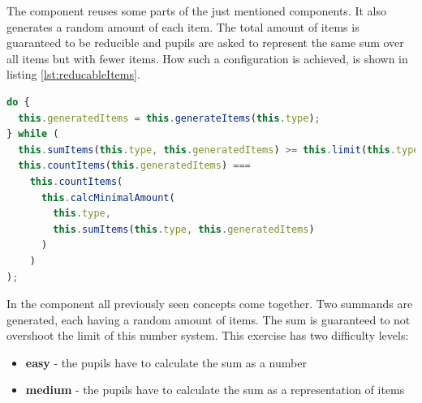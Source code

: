 The  component reuses some parts of the just mentioned components. It also generates a random amount of each item. The total amount of items is guaranteed to be reducible and pupils are asked to represent the same sum over all items but with fewer items. How such a configuration is achieved, is shown in listing \ref{lst:reducableItems}.

\begin{lstlisting}[language=TypeScript,caption={Generate a reducible item configuration},label={lst:reducableItems}]
do {
  this.generatedItems = this.generateItems(this.type);
} while (
  this.sumItems(this.type, this.generatedItems) >= this.limit(this.type) ||
  this.countItems(this.generatedItems) ===
    this.countItems(
      this.calcMinimalAmount(
        this.type,
        this.sumItems(this.type, this.generatedItems)
      )
    )
);
\end{lstlisting}

In the  component all previously seen concepts come together. Two summands are generated, each having a random amount of items. The sum is guaranteed to not overshoot the limit of this number system. This exercise has two difficulty levels:

\begin{itemize}
  \item \textbf{easy} - the pupils have to calculate the sum as a number 
  \item \textbf{medium} - the pupils have to calculate the sum as a representation of items
\end{itemize}
